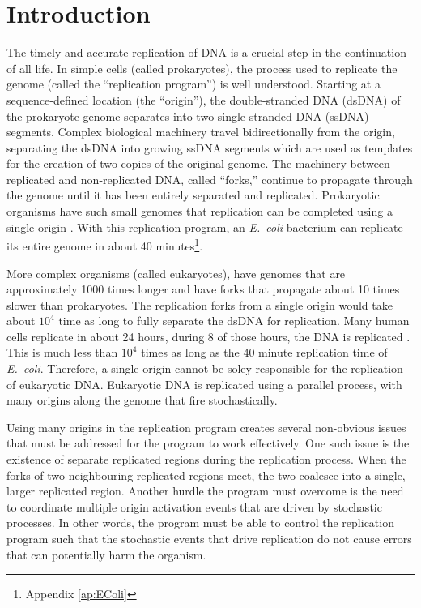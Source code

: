 \chapter{Introduction}
\label{ch:Introduction'}

The timely and accurate replication of DNA is a crucial step in the continuation of all life.
In simple cells (called prokaryotes), the process used to replicate the genome (called the ``replication program'') is well understood.
Starting at a sequence-defined location (the ``origin''), the double-stranded DNA (dsDNA) of the prokaryote genome separates into two single-stranded DNA (ssDNA) segments.
Complex biological machinery travel bidirectionally from the origin, separating the dsDNA into growing ssDNA segments which are used as templates for the creation of two copies of the original genome.
The machinery between replicated and non-replicated DNA, called ``forks,'' continue to propagate through the genome until it has been entirely separated and replicated.
Prokaryotic organisms have such small genomes that replication can be completed using a single origin \cite{MolecularCellBiology}.
With this replication program, an \emph{E.~coli} bacterium can replicate its entire genome in about 40 minutes\footnote{Appendix \ref{ap:EColi}}.

More complex organisms (called eukaryotes), have genomes that are approximately 1000 times longer and have forks that propagate about 10 times slower than prokaryotes.
The replication forks from a single origin would take about $10^4$ time as long to fully separate the dsDNA for replication.
Many human cells replicate in about 24 hours, during 8 of those hours, the DNA is replicated \cite{CellMolApproach}.
This is much less than $10^4$ times as long as the 40 minute replication time of \emph{E.~coli}.
Therefore, a single origin cannot be soley responsible for the replication of eukaryotic DNA.
Eukaryotic DNA is replicated using a parallel process, with many origins along the genome that fire stochastically.

Using many origins in the replication program creates several non-obvious issues that must be addressed for the program to work effectively.
One such issue is the existence of separate replicated regions during the replication process.
When the forks of two neighbouring replicated regions meet, the two coalesce into a single, larger replicated region.
Another hurdle the program must overcome is the need to coordinate multiple origin activation events that are driven by stochastic processes.
In other words, the program must be able to control the replication program such that the stochastic events that drive replication do not cause errors that can potentially harm the organism. \cite{eukaryotereview}


